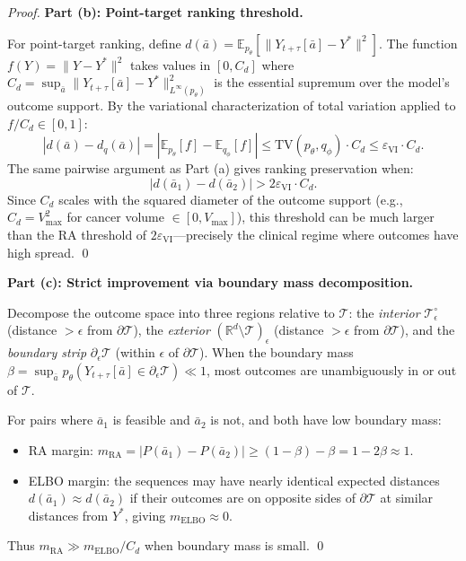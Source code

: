 \documentclass{article}
\newcommand{\R}{\mathbb{R}}
\newcommand{\E}{\mathbb{E}}
\newcommand{\TV}{\mathrm{TV}}
\newcommand{\ba}{\bar{a}}
\newcommand{\cT}{\mathcal{T}}
\begin{document}
\begin{proof}
\medskip

\textbf{Part (b): Point-target ranking threshold.}

For point-target ranking, define $d(\ba) = \E_{p_\theta}[\|Y_{t+\tau}[\ba] - Y^*\|^2]$. The function $f(Y) = \|Y - Y^*\|^2$ takes values in $[0, C_d]$ where $C_d = \sup_{\ba} \|Y_{t+\tau}[\ba] - Y^*\|^2_{L^\infty(p_\theta)}$ is the essential supremum over the model's outcome support. By the variational characterization of total variation applied to $f/C_d \in [0,1]$:
\[
|d(\ba) - d_q(\ba)| = |\E_{p_\theta}[f] - \E_{q_\phi}[f]| \leq \TV(p_\theta, q_\phi) \cdot C_d \leq \varepsilon_{\mathrm{VI}} \cdot C_d.
\]
The same pairwise argument as Part (a) gives ranking preservation when:
\[
|d(\ba_1) - d(\ba_2)| > 2\varepsilon_{\mathrm{VI}} \cdot C_d.
\]
Since $C_d$ scales with the squared diameter of the outcome support (e.g., $C_d = V_{\max}^2$ for cancer volume $\in [0, V_{\max}]$), this threshold can be much larger than the RA threshold of $2\varepsilon_{\mathrm{VI}}$---precisely the clinical regime where outcomes have high spread. \qed

\medskip

\textbf{Part (c): Strict improvement via boundary mass decomposition.}

Decompose the outcome space into three regions relative to $\cT$: the \emph{interior} $\cT^\circ_\epsilon$ (distance $> \epsilon$ from $\partial \cT$), the \emph{exterior} $(\R^d \setminus \cT)_\epsilon$ (distance $> \epsilon$ from $\partial \cT$), and the \emph{boundary strip} $\partial_\epsilon \cT$ (within $\epsilon$ of $\partial \cT$). When the boundary mass $\beta = \sup_\ba p_\theta(Y_{t+\tau}[\ba] \in \partial_\epsilon \cT) \ll 1$, most outcomes are unambiguously in or out of $\cT$.

For pairs where $\ba_1$ is feasible and $\ba_2$ is not, and both have low boundary mass:
\begin{itemize}
    \item RA margin: $m_{\mathrm{RA}} = |P(\ba_1) - P(\ba_2)| \geq (1 - \beta) - \beta = 1 - 2\beta \approx 1$.
    \item ELBO margin: the sequences may have nearly identical expected distances $d(\ba_1) \approx d(\ba_2)$ if their outcomes are on opposite sides of $\partial \cT$ at similar distances from $Y^*$, giving $m_{\mathrm{ELBO}} \approx 0$.
\end{itemize}
Thus $m_{\mathrm{RA}} \gg m_{\mathrm{ELBO}}/C_d$ when boundary mass is small. \qed
\end{proof}
\end{document}
